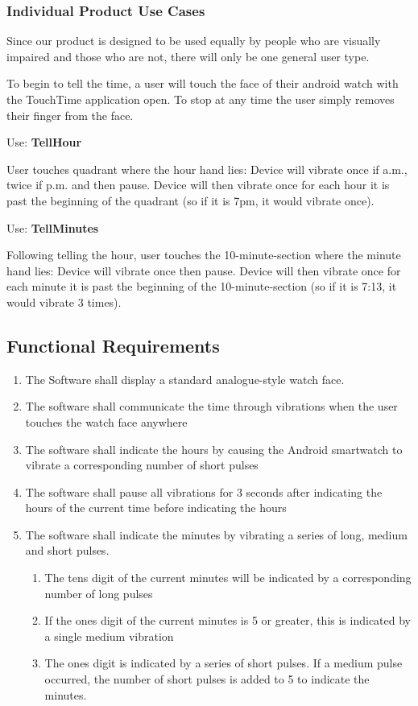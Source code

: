 \documentclass[12pt, titlepage]{article}
\begin{document}
\subsubsection{Individual Product Use Cases}

Since our product is designed to be used equally by people who are visually impaired and those who are not, there will only be one general user type.
\vspace{2mm}

To begin to tell the time, a user will touch the face of their android watch with the TouchTime application open. To stop at any time the user simply removes their finger from the face.
\vspace{2mm}

\noindent Use: \textbf{TellHour}

User touches quadrant where the hour hand lies:
	Device will vibrate once if a.m., twice if p.m. and then pause.
	Device will then vibrate once for each hour it is past the beginning of the quadrant (so if it is 7pm, it would vibrate once).
\vspace{2mm}

\noindent Use: \textbf{TellMinutes}

Following telling the hour, user touches the 10-minute-section where the minute hand lies:
	Device will vibrate once then pause.
	Device will then vibrate once for each minute it is past the beginning of the 10-minute-section (so if it is 7:13, it would vibrate 3 times).

\newpage
\subsection{Functional Requirements}
\begin{enumerate}
\item The Software shall display a standard analogue-style watch face.
\item The software shall communicate the time through vibrations when the user touches the watch face anywhere
\item The software shall indicate the hours by causing the Android smartwatch to vibrate a corresponding number of short pulses
\item The software shall pause all vibrations for 3 seconds after indicating the hours of the current time before indicating the hours
\item The software shall indicate the minutes by vibrating a series of long, medium and short pulses.
\begin{enumerate}
\item The tens digit of the current minutes will be indicated by a corresponding number of long pulses
\item If the ones digit of the current minutes is 5 or greater, this is indicated by a single medium vibration
\item The ones digit is indicated by a series of short pulses. If a medium pulse occurred, the number of short pulses is added to 5 to indicate the minutes.
\end{enumerate}

\end{enumerate}
\end{document}
